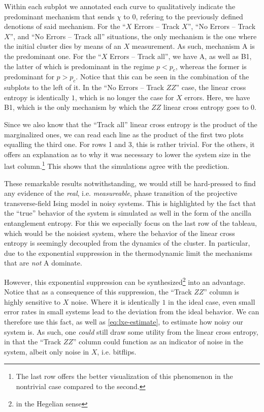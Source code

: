 Within each subplot we annotated each curve to qualitatively indicate the
predominant mechanism that sends $\chi$ to $0$, refering to the previously
defined denotions of said mechanism. For the \enquote{$X$ Errors -- Track $X$},
\enquote{No Errors -- Track $X$}, and \enquote{No Errors -- Track all}
situations, the only mechanism is the one where the initial cluster dies by
means of an $X$ measurement. As such, mechanism \textsf{A} is the predominant
one. For the \enquote{$X$ Errors -- Track all}, we have \textsf{A}, as well as
\textsf{B1}, the latter of which is predominant in the regime $p<p_c$, whereas
the former is predominant for $p> p_c$. Notice that this can be seen in the
combination of the subplots to the left of it. In the \enquote{No Errors --
Track $ZZ$} case, the linear cross entropy is identically $1$, which is no
longer the case for $X$ errors. Here, we have \textsf{B1}, which is the only
mechanism by which the $ZZ$ linear cross entropy goes to 0.

Since we also know that the \enquote{Track all} linear cross entropy is the
product of the marginalized ones, we can read each line as the product of the
first two plots equalling the third one. For rows 1 and 3, this is rather
trivial. For the others, it offers an explanation as to why it was necessary to
lower the system size in the last column.\footnote{The last row offers the
better visualization of this phenomenon in the nontrivial case compared to the
second.} This shows that the simulations agree with the prediction.

These remarkable results notwithstanding, we would still be hard-pressed to
find any evidence of the \emph{real}, i.e. \emph{measureable}, phase transition
of the projective transverse-field Ising model in noisy systems. This is highlighted by the fact
that the \enquote{true} behavior of the system is simulated as well in the form
of the ancilla entanglement entropy. For this we especially focus on the last
row of the tableau, which would be the noisiest system, where the behavior of
the linear cross entropy is seemingly decoupled from the dynamics of the
cluster. In particular, due to the exponential suppression in the
thermodynamic limit the mechanisms that are \emph{not} \textsf{A} dominate.  

However, this exponential suppression can be synthesized\footnote{in the
Hegelian sense} into an advantage. Notice that as a consequence of this
suppression, the \enquote{Track $ZZ$} column is highly sensitive to $X$ noise.
Where it is identically $1$ in the ideal case, even small error rates in small
systems lead to the deviation from the ideal behavior. We can therefore use
this fact, as well as \cref{eq:lxe-estimate}, to estimate how noisy our system
is. As such, one \emph{could} still draw some utility from the linear cross
entropy, in that the \enquote{Track $ZZ$} column could function as an indicator
of noise in the system, albeit only noise in $X$, i.e. bitflips. 

